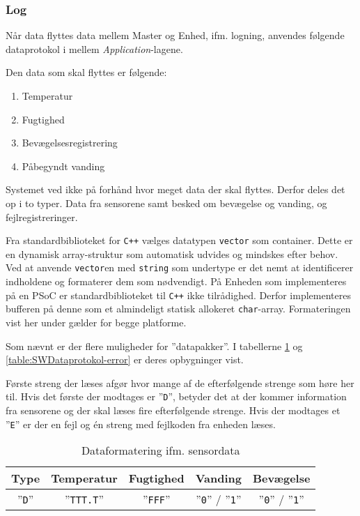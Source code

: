 \subsubsection{Log}

Når data flyttes data mellem Master og Enhed, ifm. logning, anvendes følgende dataprotokol i mellem \textit{Application}-lagene.

Den data som skal flyttes er følgende:

\begin{enumerate}
	\item Temperatur
	\item Fugtighed
	\item Bevægelsesregistrering
	\item Påbegyndt vanding
\end{enumerate}

Systemet ved ikke på forhånd hvor meget data der skal flyttes. Derfor deles det op i to typer. Data fra sensorene samt besked om bevægelse og vanding, og fejlregistreringer.

Fra standardbiblioteket for \verb'C++' vælges datatypen \verb+vector+ som container. Dette er en dynamisk array-struktur som automatisk udvides og mindskes efter behov.
Ved at anvende \verb+vector+en med \verb+string+ som undertype er det nemt at identificerer indholdene og formaterer dem som nødvendigt. På Enheden som implementeres på en PSoC er standardbiblioteket til \verb-C++- ikke tilrådighed. Derfor implementeres bufferen på denne som et almindeligt statisk allokeret \verb+char+-array. Formateringen vist her under gælder for begge platforme.

Som nævnt er der flere muligheder for ''datapakker''. I tabellerne \ref{table:SWDataprotokol-sensor} og \ref{table:SWDataprotokol-error} er deres opbygninger vist.

Første streng der læses afgør hvor mange af de efterfølgende strenge som høre her til. Hvis det første der modtages er ''\verb+D+'', betyder det at der kommer information fra sensorene og der skal læses fire efterfølgende strenge.
Hvis der modtages et ''\verb+E+'' er der en fejl og én streng med fejlkoden fra enheden læses.

\begin{table}[h]
	\caption{Dataformatering ifm. sensordata}
	\centering
	\begin{tabular}{|c|c|c|c|c|}
		\hline 
		\textbf{Type} & \textbf{Temperatur} & \textbf{Fugtighed} & \textbf{Vanding} & \textbf{Bevægelse}\\ 
		\hline 
		''\verb+D+'' & ''\verb+TTT.T+'' & ''\verb+FFF+'' & ''\verb+0+'' / ''\verb+1+'' & ''\verb+0+'' / ''\verb+1+'' \\ 
		\hline 
	\end{tabular} 
	\label{table:SWDataprotokol-sensor}
\end{table}

